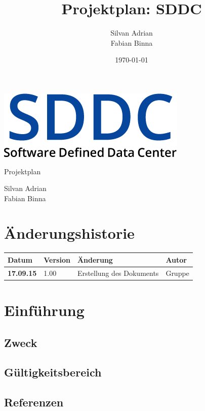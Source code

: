 \documentclass[11pt]{scrartcl}
\title{Projektplan: SDDC}
\author{Silvan Adrian \\ Fabian Binna}
\date{\today{}}
\begin{document}
\def\arraystretch{1.5}
\begin{titlepage}
\begin{center}
\vspace{10em}
\includegraphics[scale=2]{SDDC}
\vspace{10em}
\end{center}
\begin{center}
\huge {Projektplan}
\end{center}
\begin{center}
\vspace{10em}
\LARGE {Silvan Adrian} \\
\LARGE {Fabian Binna}
\end{center}

\end{titlepage}

\newpage
\section{Änderungshistorie}
\begin{tabularx}{\linewidth}{l l l l}
\textbf{Datum} & \textbf{Version} & \textbf{Änderung}  & \textbf{Autor} \\
\hline
\textbf{17.09.15} & 1.00 & Erstellung des Dokuments & Gruppe \\

\end{tabularx}

\newpage
\tableofcontents
\newpage

\section{Einführung}
\label{sec:Einführung}
\subsection{Zweck}

\subsection{Gültigkeitsbereich}

\subsection{Referenzen}
\end{document}
